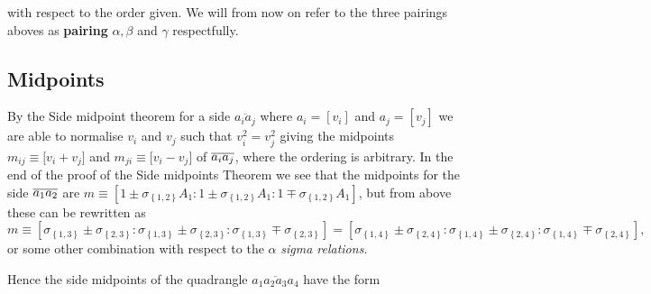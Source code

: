 \documentclass[11pt]{article}
\begin{document}
\bigskip with respect to the order given. We will from now on refer to the
three pairings aboves as \textbf{pairing }$\alpha ,\beta $ and $\gamma $
respectfully.

\subsection{Midpoints}

By the Side midpoint theorem for a side $\overline{a_{i}a_{j}}$ where $%
a_{i}=[v_{i}]$ and $a_{j}=[v_{j}]$ we are able to normalise $v_{i}$ and $%
v_{j}$ such that $v_{i}^{2}=v_{j}^{2}$ giving the midpoints $m_{ij}\equiv
\lbrack v_{i}+v_{j}]$ and $m_{ji}\equiv \lbrack v_{i}-v_{j}]$ of $\overline{%
a_{i}a_{j}}$, where the ordering is arbitrary. In the end of the proof of
the Side midpoints Theorem we see that the midpoints for the side $\overline{%
a_{1}a_{2}}$ are $m\equiv \left[ 1\pm \sigma _{\left\{ 1,2\right\}
}A_{1}:1\pm \sigma _{\left\{ 1,2\right\} }A_{1}:1\mp \sigma _{\left\{
1,2\right\} }A_{1}\right] $, but from above these can be rewritten as 
\begin{equation*}
m\equiv \left[ \sigma _{\left\{ 1,3\right\} }\pm \sigma _{\left\{
2,3\right\} }:\sigma _{\left\{ 1,3\right\} }\pm \sigma _{\left\{ 2,3\right\}
}:\sigma _{\left\{ 1,3\right\} }\mp \sigma _{\left\{ 2,3\right\} }\right] =%
\left[ \sigma _{\left\{ 1,4\right\} }\pm \sigma _{\left\{ 2,4\right\}
}:\sigma _{\left\{ 1,4\right\} }\pm \sigma _{\left\{ 2,4\right\} }:\sigma
_{\left\{ 1,4\right\} }\mp \sigma _{\left\{ 2,4\right\} }\right] ,
\end{equation*}%
or some other combination with respect to the $\alpha $ \textit{sigma
relations}.

Hence the side midpoints of the quadrangle $\overline{a_{1}a_{2}a_{3}a_{4}}$
have the form
\end{document}
